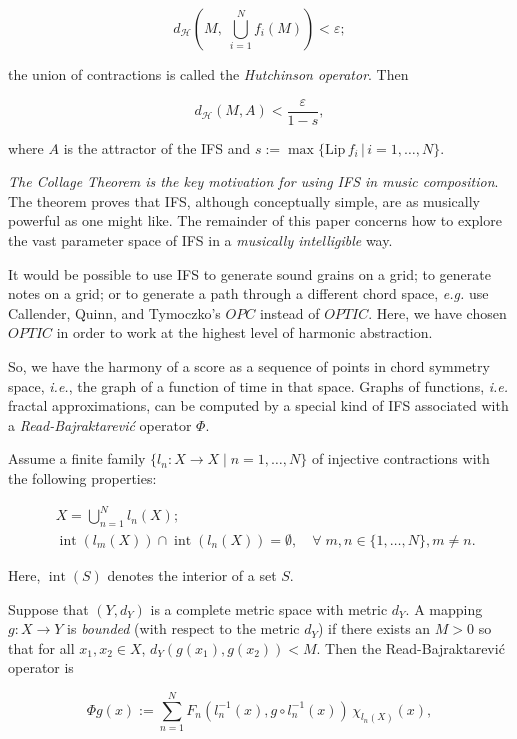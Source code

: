 \documentclass[english,11pt,letterpaper,onecolumn]{scrartcl}
\numberwithin{equation}{section}
\newcommand{\st}{\,|\,}
\newcommand{\calH}{\mathcal{H}}
\newcommand{\Int}{\mathop{\mathrm{int}}}
\newcommand{\be}{\begin{equation}}
\newcommand{\ee}{\end{equation}}
\begin{document}
\be\label{hutchop}
d_\calH \left(M, \;\bigcup_{i=1}^N f_i (M) \right) < \varepsilon;
\ee

\noindent the union of contractions is called the \textit{Hutchinson operator}.
Then

\[
d_\calH (M, A) < \frac{\varepsilon}{1-s},
\]

\noindent where $A$ is the attractor of the IFS and $s :=
\max\{\mathrm{Lip}\,f_i\st
i = 1, \ldots, N\}$.

\textit{The Collage Theorem is the key motivation for using IFS in music
composition}. The theorem proves that IFS, although conceptually simple, are as
musically powerful as one might like. The remainder of this paper concerns how
to explore the vast parameter space of IFS in a \textit{musically intelligible}
way.

It would be possible to use IFS to generate sound grains on a grid; to generate
notes on a grid; or to generate a path through a different chord space,
\textit{e.g.} use Callender, Quinn, and Tymoczko's $OPC$ instead of $OPTIC$.
Here, we have chosen $OPTIC$ in order to work at the highest level of harmonic
abstraction.

So, we have the harmony of a score as a sequence of points in chord symmetry
space, \textit{i.e.}, the graph of a function of time in that space. Graphs of
functions, \textit{i.e.} fractal approximations, can be computed by a special
kind of IFS associated with a \textit{Read-Bajraktarevi\'c} operator $\Phi$.

Assume a finite family $\{l_n : X\to X \mid n = 1, \ldots, N\}$ of injective
contractions with the following properties:

\begin{align}
&X = \bigcup_{n=1}^N l_n(X);\label{union}\\
&\Int (l_m(X))\cap \Int(l_n(X)) = \emptyset, \quad\forall\;m, n\in \{1,\ldots,
N\}, m\neq n.
\end{align}

\noindent Here, $\Int (S)$ denotes the interior of a set $S$.

Suppose that $(Y,d_Y)$ is a complete metric space with metric $d_Y$. A mapping
$g:X\to Y$ is \emph{bounded} (with respect to the metric $d_Y$) if
there exists an $M > 0$ so that for all $x_1, x_2\in X$, $d_Y(g(x_1),g(x_2)) <
M$. Then the Read-Bajraktarevi\'c operator is

\be\label{RB}
\Phi g (x) := \sum\limits_{n=1}^N F_n (l_n^{-1} (x), g\circ l_n^{-1}
(x))\,\chi_{l_n(X)}(x),
\ee
\end{document}

